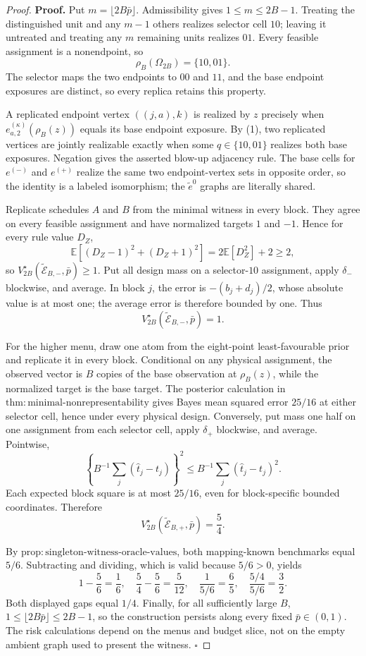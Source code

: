 \documentclass{article}
\begin{document}
\begin{proof}
\textbf{Proof.}
Put \(m=\lfloor2B\bar p\rfloor\). Admissibility gives \(1\le m\le2B-1\). Treating the distinguished unit and any \(m-1\) others realizes selector cell \(10\); leaving it untreated and treating any \(m\) remaining units realizes \(01\). Every feasible assignment is a nonendpoint, so
\[
 \rho_B(\Omega_{2B})=\{10,01\}. \tag{1}
\]
The selector maps the two endpoints to \(00\) and \(11\), and the base endpoint exposures are distinct, so every replica retains this property.

A replicated endpoint vertex \(((j,a),k)\) is realized by \(z\) precisely when \(e^{(\kappa)}_{a,2}(\rho_B(z))\) equals its base endpoint exposure. By (1), two replicated vertices are jointly realizable exactly when some \(q\in\{10,01\}\) realizes both base exposures. Negation gives the asserted blow-up adjacency rule. The base cells for \(e^{(-)}\) and \(e^{(+)}\) realize the same two endpoint-vertex sets in opposite order, so the identity is a labeled isomorphism; the \(\widetilde e^0\) graphs are literally shared.

Replicate schedules \(A\) and \(B\) from the minimal witness in every block. They agree on every feasible assignment and have normalized targets \(1\) and \(-1\). Hence for every rule value \(D_Z\),
\[
 \mathbb E[(D_Z-1)^2+(D_Z+1)^2]=2\mathbb E[D_Z^2]+2\ge2,
\]
so \(V_{2B}^\star(\widetilde{\mathcal E}_{B,-},\bar p)\ge1\). Put all design mass on a selector-\(10\) assignment, apply \(\delta_-\) blockwise, and average. In block \(j\), the error is \(-(b_j+d_j)/2\), whose absolute value is at most one; the average error is therefore bounded by one. Thus
\[
 V_{2B}^\star(\widetilde{\mathcal E}_{B,-},\bar p)=1. \tag{2}
\]

For the higher menu, draw one atom from the eight-point least-favourable prior and replicate it in every block. Conditional on any physical assignment, the observed vector is \(B\) copies of the base observation at \(\rho_B(z)\), while the normalized target is the base target. The posterior calculation in \(\mathrm{thm{:}minimal\text{-}nonrepresentability}\) gives Bayes mean squared error \(25/16\) at either selector cell, hence under every physical design. Conversely, put mass one half on one assignment from each selector cell, apply \(\delta_+\) blockwise, and average. Pointwise,
\[
 \left\{B^{-1}\sum_j(\widehat t_j-t_j)\right\}^2
 \le B^{-1}\sum_j(\widehat t_j-t_j)^2.
\]
Each expected block square is at most \(25/16\), even for block-specific bounded coordinates. Therefore
\[
 V_{2B}^\star(\widetilde{\mathcal E}_{B,+},\bar p)=\frac54. \tag{3}
\]

By \(\mathrm{prop{:}singleton\text{-}witness\text{-}oracle\text{-}values}\), both mapping-known benchmarks equal \(5/6\). Subtracting and dividing, which is valid because \(5/6>0\), yields
\[
 1-\frac56=\frac16,
 \quad \frac54-\frac56=\frac5{12},
 \quad \frac1{5/6}=\frac65,
 \quad \frac{5/4}{5/6}=\frac32.
\]
Both displayed gaps equal \(1/4\). Finally, for all sufficiently large \(B\), \(1\le\lfloor2B\bar p\rfloor\le2B-1\), so the construction persists along every fixed \(\bar p\in(0,1)\). The risk calculations depend on the menus and budget slice, not on the empty ambient graph used to present the witness. \(\square\)
\end{proof}
\end{document}

